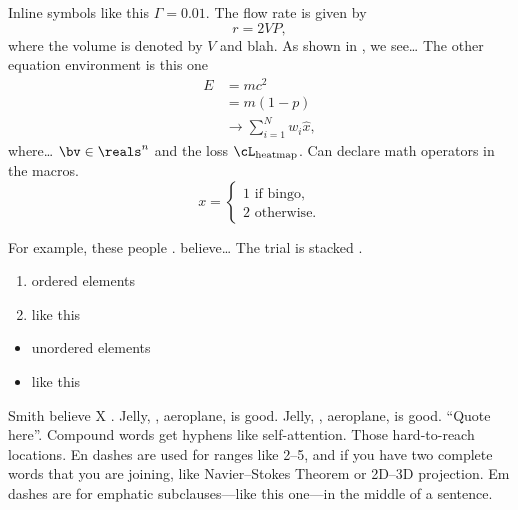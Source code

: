 Inline symbols like this $\Gamma = 0.01$. The flow rate is given by
\begin{equation}
    r = 2VP,
    \label{eq:flowrate}
\end{equation}
where the volume is denoted by $V$ and blah. As shown in , we see\dots
The other equation environment is this one
\begin{align}
    E &= mc^2\\
      &= m(1-p)\\
      &\rightarrow \sum_{i=1}^{N} w_i \hat{x},
\end{align}
where\dots
$\bv \in \reals^n$ and the loss $\cL_\text{heatmap}$.
Can declare math operators in the macros.
\begin{equation}
    x =
    \begin{cases}
        1 \text{ if bingo,}\\
        2 \text{ otherwise.}
    \end{cases}
\end{equation}

For example, these people \citep{engelhardt2024shinobi,Cooper2015SuperfluidVacuumTheory,Oetiker2021LatexIntroduction}.
\citet{Cooper2015SuperfluidVacuumTheory} believe\dots
The trial is stacked \citep{Cooper2015SuperfluidVacuumTheory}.


\begin{enumerate}
    \item ordered elements
    \item like this
\end{enumerate}
\begin{itemize}
    \item unordered elements
    \item like this
\end{itemize}

Smith \etal believe X \citep{Smith2021Wubalubadubdub}.
Jelly, \eg, aeroplane, is good.
Jelly, \ie, aeroplane, is good.
``Quote here''. %
Compound words get hyphens like self-attention. Those hard-to-reach locations.
En dashes are used for ranges like 2--5, and if you have two complete words that you are joining, like Navier--Stokes Theorem or 2D--3D projection.
Em dashes are for emphatic subclauses---like this one---in the middle of a sentence.

